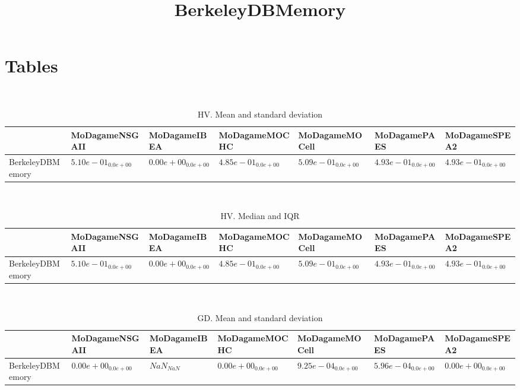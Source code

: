 \documentclass{article}
\title{BerkeleyDBMemory}
\author{}
\begin{document}
\maketitle
\section{Tables}
\
\begin{table}
\caption{HV. Mean and standard deviation}
\label{table:mean.HV}
\centering
\begin{scriptsize}
\begin{tabular}{lllllll}
\hline & MoDagameNSGAII & MoDagameIBEA & MoDagameMOCHC & MoDagameMOCell & MoDagamePAES &  MoDagameSPEA2\\
\hline
BerkeleyDBMemory & \cellcolor{gray95}$  5.10e-01_{ 0.0e+00}$ & $  0.00e+00_{ 0.0e+00}$ & $  4.85e-01_{ 0.0e+00}$ & \cellcolor{gray25}$  5.09e-01_{ 0.0e+00}$ & $  4.93e-01_{ 0.0e+00}$ & $  4.93e-01_{ 0.0e+00}$ \\
\hline
\end{tabular}
\end{scriptsize}
\end{table}
\
\begin{table}
\caption{HV. Median and IQR}
\label{table:median.HV}
\begin{scriptsize}
\centering
\begin{tabular}{lllllll}
\hline & MoDagameNSGAII & MoDagameIBEA & MoDagameMOCHC & MoDagameMOCell & MoDagamePAES &  MoDagameSPEA2\\
\hline
BerkeleyDBMemory & \cellcolor{gray95}$  5.10e-01_{ 0.0e+00}$ & $  0.00e+00_{ 0.0e+00}$ & $  4.85e-01_{ 0.0e+00}$ & \cellcolor{gray25}$  5.09e-01_{ 0.0e+00}$ & $  4.93e-01_{ 0.0e+00}$ & $  4.93e-01_{ 0.0e+00}$ \\
\hline
\end{tabular}
\end{scriptsize}
\end{table}
\
\begin{table}
\caption{GD. Mean and standard deviation}
\label{table:mean.GD}
\centering
\begin{scriptsize}
\begin{tabular}{lllllll}
\hline & MoDagameNSGAII & MoDagameIBEA & MoDagameMOCHC & MoDagameMOCell & MoDagamePAES &  MoDagameSPEA2\\
\hline
BerkeleyDBMemory & \cellcolor{gray95}$  0.00e+00_{ 0.0e+00}$ & $       NaN_{     NaN}$ & \cellcolor{gray25}$  0.00e+00_{ 0.0e+00}$ & $  9.25e-04_{ 0.0e+00}$ & $  5.96e-04_{ 0.0e+00}$ & $  0.00e+00_{ 0.0e+00}$ \\
\hline
\end{tabular}
\end{scriptsize}
\end{table}
\end{document}
